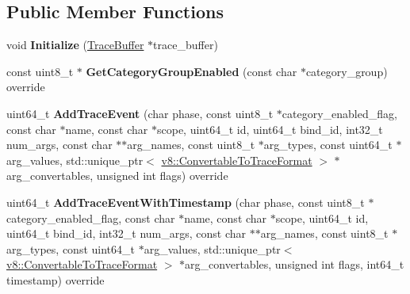 \subsection*{Public Member Functions}
\begin{DoxyCompactItemize}
\item 
\mbox{\label{classv8_1_1platform_1_1tracing_1_1TracingController_a361ffa698158fbb919c92adf24c1af75}} 
void {\bfseries Initialize} (\mbox{\hyperlink{classv8_1_1platform_1_1tracing_1_1TraceBuffer}{Trace\+Buffer}} $\ast$trace\+\_\+buffer)
\item 
\mbox{\label{classv8_1_1platform_1_1tracing_1_1TracingController_a3540fc4ac1cbb1923e208e6eb0117b6b}} 
const uint8\+\_\+t $\ast$ {\bfseries Get\+Category\+Group\+Enabled} (const char $\ast$category\+\_\+group) override
\item 
\mbox{\label{classv8_1_1platform_1_1tracing_1_1TracingController_a47338b4633756d96faf31f51b92e7f2e}} 
uint64\+\_\+t {\bfseries Add\+Trace\+Event} (char phase, const uint8\+\_\+t $\ast$category\+\_\+enabled\+\_\+flag, const char $\ast$name, const char $\ast$scope, uint64\+\_\+t id, uint64\+\_\+t bind\+\_\+id, int32\+\_\+t num\+\_\+args, const char $\ast$$\ast$arg\+\_\+names, const uint8\+\_\+t $\ast$arg\+\_\+types, const uint64\+\_\+t $\ast$arg\+\_\+values, std\+::unique\+\_\+ptr$<$ \mbox{\hyperlink{classv8_1_1ConvertableToTraceFormat}{v8\+::\+Convertable\+To\+Trace\+Format}} $>$ $\ast$arg\+\_\+convertables, unsigned int flags) override
\item 
\mbox{\label{classv8_1_1platform_1_1tracing_1_1TracingController_afe55e970fb86427e59fb58c6b60fea80}} 
uint64\+\_\+t {\bfseries Add\+Trace\+Event\+With\+Timestamp} (char phase, const uint8\+\_\+t $\ast$category\+\_\+enabled\+\_\+flag, const char $\ast$name, const char $\ast$scope, uint64\+\_\+t id, uint64\+\_\+t bind\+\_\+id, int32\+\_\+t num\+\_\+args, const char $\ast$$\ast$arg\+\_\+names, const uint8\+\_\+t $\ast$arg\+\_\+types, const uint64\+\_\+t $\ast$arg\+\_\+values, std\+::unique\+\_\+ptr$<$ \mbox{\hyperlink{classv8_1_1ConvertableToTraceFormat}{v8\+::\+Convertable\+To\+Trace\+Format}} $>$ $\ast$arg\+\_\+convertables, unsigned int flags, int64\+\_\+t timestamp) override

\end{DoxyCompactItemize}

